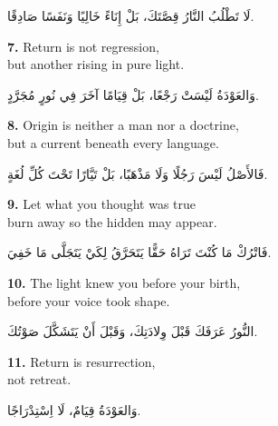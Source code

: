 \documentclass[11pt,a4paper,twoside]{book}
\begin{document}
\begin{flushright}
{\arabicfont
لَا تَطْلُبُ النَّارُ قِصَّتَكَ،
بَلْ إِنَاءً خَالِيًا وَنَفَسًا صَادِقًا.}
\end{flushright}

\vspace{1em}
{\color{indigo}\bfseries 7.}\quad
Return is not regression,\\
but another rising in pure light.

\begin{flushright}
{\arabicfont
وَالعَوْدَةُ لَيْسَتْ رَجْعًا،
بَلْ قِيَامًا آخَرَ فِي نُورٍ مُجَرَّدٍ.}
\end{flushright}

\vspace{1em}
{\color{indigo}\bfseries 8.}\quad
Origin is neither a man nor a doctrine,\\
but a current beneath every language.

\begin{flushright}
{\arabicfont
فَالأَصْلُ لَيْسَ رَجُلًا وَلَا مَذْهَبًا،
بَلْ تَيَّارًا تَحْتَ كُلِّ لُغَةٍ.}
\end{flushright}

\vspace{1em}
{\color{indigo}\bfseries 9.}\quad
Let what you thought was true\\
burn away so the hidden may appear.

\begin{flushright}
{\arabicfont
فَاتْرُكْ مَا كُنْتَ تَرَاهُ حَقًّا
يَتَحَرَّقُ لِكَيْ يَتَجَلَّى مَا خَفِيَ.}
\end{flushright}

\vspace{1em}
{\color{indigo}\bfseries 10.}\quad
The light knew you before your birth,\\
before your voice took shape.

\begin{flushright}
{\arabicfont
النُّورُ عَرَفَكَ قَبْلَ وِلادَتِكَ،
وَقَبْلَ أَنْ يَتَشَكَّلَ صَوْتُكَ.}
\end{flushright}

\vspace{1em}
{\color{indigo}\bfseries 11.}\quad
Return is resurrection,\\
not retreat.

\begin{flushright}
{\arabicfont
وَالعَوْدَةُ قِيَامٌ،
لَا اِسْتِدْرَاجًا.}
\end{flushright}
\end{document}

